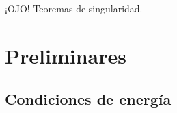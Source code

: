 \documentclass{article}
\numberwithin{equation}{section}
\begin{document}
¡OJO! Teoremas de singularidad.

\section{\label{preliminaries section} Preliminares}

%
%
%
%
%
%
%
%
%
%

\subsection{Condiciones de energía}
\end{document}
